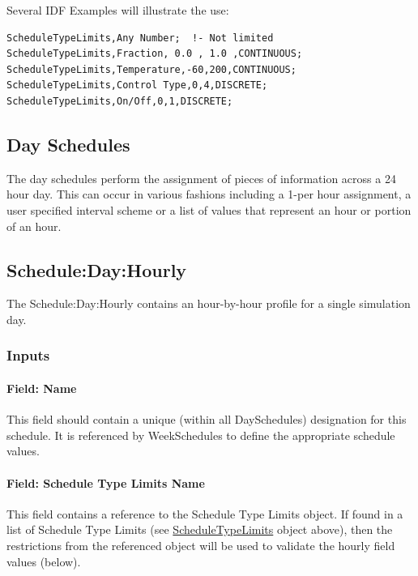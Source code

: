 Several IDF Examples will illustrate the use:

\begin{lstlisting}
ScheduleTypeLimits,Any Number;  !- Not limited
ScheduleTypeLimits,Fraction, 0.0 , 1.0 ,CONTINUOUS;
ScheduleTypeLimits,Temperature,-60,200,CONTINUOUS;
ScheduleTypeLimits,Control Type,0,4,DISCRETE;
ScheduleTypeLimits,On/Off,0,1,DISCRETE;
\end{lstlisting}

\subsection{Day Schedules}\label{day-schedules}

The day schedules perform the assignment of pieces of information across a 24 hour day. This can occur in various fashions including a 1-per hour assignment, a user specified interval scheme or a list of values that represent an hour or portion of an hour.

\subsection{Schedule:Day:Hourly}\label{scheduledayhourly}

The Schedule:Day:Hourly contains an hour-by-hour profile for a single simulation day.

\subsubsection{Inputs}\label{inputs-1-039}

\paragraph{Field: Name}\label{field-name-1-038}

This field should contain a unique (within all DaySchedules) designation for this schedule. It is referenced by WeekSchedules to define the appropriate schedule values.

\paragraph{Field: Schedule Type Limits Name}\label{field-schedule-type-limits-name-000}

This field contains a reference to the Schedule Type Limits object. If found in a list of Schedule Type Limits (see \hyperref[scheduletypelimits]{ScheduleTypeLimits} object above), then the restrictions from the referenced object will be used to validate the hourly field values (below).

